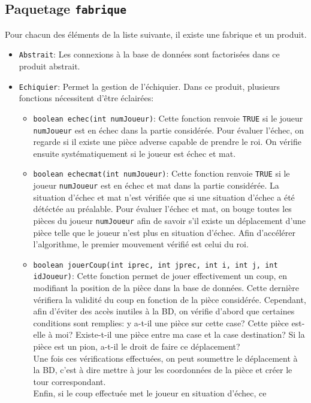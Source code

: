 \documentclass[10pt,a4paper]{report}
\begin{document}
\subsection{Paquetage \lstinline!fabrique!}
Pour chacun des éléments de la liste suivante, il existe une fabrique
et un produit.
\begin{itemize}
\item \lstinline!Abstrait!: Les connexions à la base de données sont
  factorisées dans ce produit abstrait.
\item \lstinline!Echiquier!: Permet la gestion de l'échiquier. 
Dans ce produit, plusieurs fonctions nécessitent d'être éclairées:
\begin{itemize}
\item \lstinline!boolean echec(int numJoueur)!:
Cette fonction renvoie \lstinline!TRUE! si le joueur
\lstinline!numJoueur! est en échec dans la partie considérée. Pour
évaluer l'échec, on regarde si il existe une pièce adverse capable de
prendre le roi. On vérifie ensuite systématiquement si le joueur est
échec et mat.
\item \lstinline!boolean echecmat(int numJoueur)!: 
Cette fonction renvoie \lstinline!TRUE! si le joueur
\lstinline!numJoueur! est en échec et mat dans la partie
considérée. La situation d'échec et mat n'est vérifiée que si une
situation d'échec a été détéctée au préalable. Pour évaluer l'échec et
mat, on bouge toutes les pièces du joueur \lstinline!numJoueur! afin
de savoir s'il existe un déplacement d'une pièce telle que le joueur
n'est plus en situation d'échec. Afin d'accélérer l'algorithme, le
premier mouvement vérifié est celui du roi.
\item \lstinline!boolean jouerCoup(int iprec, int jprec, int i, int j, int idJoueur)!:
Cette fonction permet de jouer effectivement un coup, en modifiant la
position de la pièce dans la base de données. Cette dernière vérifiera
la validité du coup en fonction de la pièce considérée. Cependant,
afin d'éviter des accès inutiles à la BD, on vérifie d'abord que
certaines conditions sont remplies: y a-t-il une pièce sur cette case?
Cette pièce est-elle à moi? Existe-t-il une pièce entre ma case et la
case destination? Si la pièce est un pion, a-t-il le droit de faire ce
déplacement?\\
Une fois ces vérifications effectuées, on peut soumettre le
déplacement à la BD, c'est à dire mettre à jour les coordonnées de la
pièce et créer le tour correspondant.\\
Enfin, si le coup effectuée met le joueur en situation d'échec, ce

\end{itemize}
\end{itemize}
\end{document}
